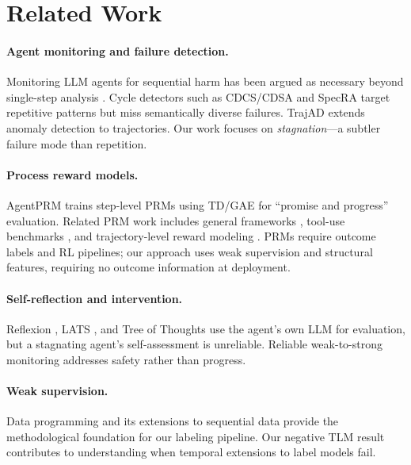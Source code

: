 \documentclass[11pt,a4paper]{article}
\begin{document}
\section{Related Work}

\paragraph{Agent monitoring and failure detection.}
Monitoring LLM agents for sequential harm has been argued as necessary beyond single-step analysis \cite{iclr2025monitoring}.
Cycle detectors such as CDCS/CDSA \cite{chen2024cdcs} and SpecRA \cite{zhang2025specra} target repetitive patterns but miss semantically diverse failures.
TrajAD \cite{trajad2025} extends anomaly detection to trajectories.
Our work focuses on \emph{stagnation}---a subtler failure mode than repetition.

\paragraph{Process reward models.}
AgentPRM \cite{xi2026agentprm} trains step-level PRMs using TD/GAE for ``promise and progress'' evaluation.
Related PRM work includes general frameworks \cite{prm_framework2025}, tool-use benchmarks \cite{toolprmbench2026}, and trajectory-level reward modeling \cite{traj_reward2026}.
PRMs require outcome labels and RL pipelines; our approach uses weak supervision and structural features, requiring no outcome information at deployment.

\paragraph{Self-reflection and intervention.}
Reflexion \cite{shinn2023reflexion}, LATS \cite{zhou2024lats}, and Tree of Thoughts \cite{yao2024tot} use the agent's own LLM for evaluation, but a stagnating agent's self-assessment is unreliable.
Reliable weak-to-strong monitoring \cite{weak2strong2025} addresses safety rather than progress.

\paragraph{Weak supervision.}
Data programming \cite{ratner2016snorkel} and its extensions to sequential data \cite{safranchik2020weakly} provide the methodological foundation for our labeling pipeline.
Our negative TLM result contributes to understanding when temporal extensions to label models fail.
\end{document}
